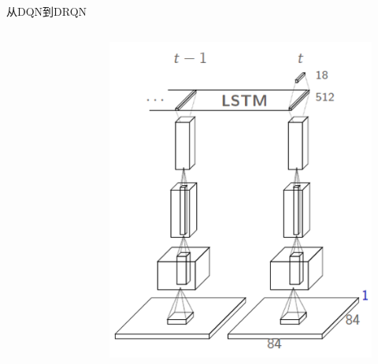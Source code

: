 \documentclass[10pt]{beamer}
\begin{document}
\begin{frame}{从DQN到DRQN}
\begin{columns}[c]
\begin{column}{.1\linewidth}
\begin{figure}
				\end{figure}
			\end{column}
			\begin{column}{.5\linewidth}
				\begin{figure}
					\centering
					\includegraphics[width=0.9\linewidth]{pictures/drqn-architecture}
				\end{figure}
				
			\end{column}
		\end{columns}
	\end{frame}
\end{document}
